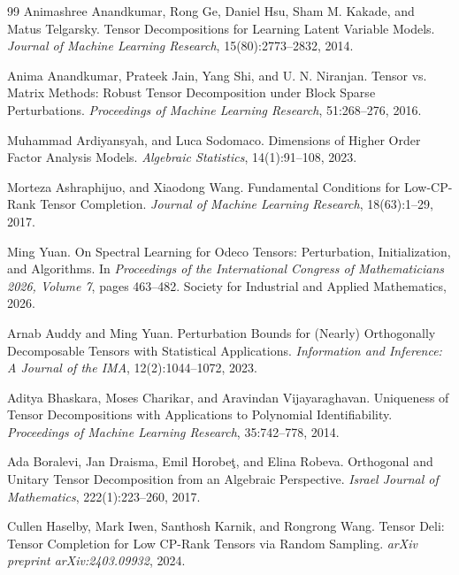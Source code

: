 \begin{thebibliography}{99}
Animashree Anandkumar, Rong Ge, Daniel Hsu, Sham M. Kakade, and Matus Telgarsky.
Tensor Decompositions for Learning Latent Variable Models.
\emph{Journal of Machine Learning Research}, 15(80):2773--2832, 2014.

Anima Anandkumar, Prateek Jain, Yang Shi, and U. N. Niranjan.
Tensor vs. Matrix Methods: Robust Tensor Decomposition under Block Sparse Perturbations.
\emph{Proceedings of Machine Learning Research}, 51:268--276, 2016.

Muhammad Ardiyansyah, and Luca Sodomaco.
Dimensions of Higher Order Factor Analysis Models.
\emph{Algebraic Statistics}, 14(1):91--108, 2023.

Morteza Ashraphijuo, and Xiaodong Wang.
Fundamental Conditions for Low-CP-Rank Tensor Completion.
\emph{Journal of Machine Learning Research}, 18(63):1--29, 2017.

Ming Yuan.
On Spectral Learning for Odeco Tensors: Perturbation, Initialization, and Algorithms.
In \emph{Proceedings of the International Congress of Mathematicians 2026, Volume 7}, pages 463--482. Society for Industrial and Applied Mathematics, 2026.

Arnab Auddy and Ming Yuan.
Perturbation Bounds for (Nearly) Orthogonally Decomposable Tensors with Statistical Applications.
\emph{Information and Inference: A Journal of the IMA}, 12(2):1044--1072, 2023.

Aditya Bhaskara, Moses Charikar, and Aravindan Vijayaraghavan.
Uniqueness of Tensor Decompositions with Applications to Polynomial Identifiability.
\emph{Proceedings of Machine Learning Research}, 35:742--778, 2014.

Ada Boralevi, Jan Draisma, Emil Horobe\c{t}, and Elina Robeva.
Orthogonal and Unitary Tensor Decomposition from an Algebraic Perspective.
\emph{Israel Journal of Mathematics}, 222(1):223--260, 2017.

Cullen Haselby, Mark Iwen, Santhosh Karnik, and Rongrong Wang.
Tensor Deli: Tensor Completion for Low CP-Rank Tensors via Random Sampling.
\emph{arXiv preprint arXiv:2403.09932}, 2024.


\end{thebibliography}

